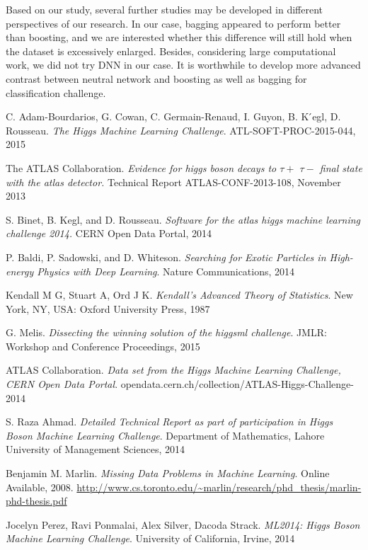 \documentclass[11pt]{article}
\begin{document}
Based on our study, several further studies may be developed in different perspectives of our research. In our case,  bagging appeared to perform better than boosting, and we are interested whether this difference will still hold when the dataset is excessively enlarged. Besides, considering large computational work, we did not try DNN in our case. It is worthwhile to develop more advanced contrast between neutral network and boosting as well as bagging for classification challenge.

\vspace{40pt}

\begin{thebibliography}{19}

C. Adam-Bourdarios, G. Cowan, C. Germain-Renaud, I. Guyon, B. K ́egl, D. Rousseau.
\textit{The Higgs Machine Learning Challenge}.
ATL-SOFT-PROC-2015-044, 2015

The ATLAS Collaboration.
\textit{Evidence for higgs boson decays to $\tau+$ $\tau-$ final state with the atlas detector.}
Technical Report ATLAS-CONF-2013-108, November 2013
 
S. Binet, B. Kegl, and D. Rousseau.
\textit{Software for the atlas higgs machine learning challenge 2014.}
CERN Open Data Portal, 2014


P. Baldi, P. Sadowski, and D. Whiteson.
\textit{Searching for Exotic Particles in High-energy Physics with Deep Learning}. 
Nature Communications, 2014
 
Kendall M G, Stuart A, Ord J K.
\textit{Kendall’s Advanced Theory of Statistics}. 
New York, NY, USA: Oxford University Press, 1987
 
G. Melis.
\textit{Dissecting the winning solution of the higgsml challenge}. 
JMLR: Workshop and Conference Proceedings, 2015

ATLAS Collaboration.
\textit{Data set from the Higgs Machine Learning Challenge, CERN Open Data Portal}. 
opendata.cern.ch/collection/ATLAS-Higgs-Challenge-2014
 
S. Raza Ahmad.
\textit{ Detailed Technical Report as part of participation in
Higgs Boson Machine Learning Challenge}. 
Department of Mathematics, Lahore University of Management Sciences, 2014
 
Benjamin M. Marlin.
\textit{Missing Data Problems in Machine Learning}. 
Online Available, 2008.  \url{http://www.cs.toronto.edu/~marlin/research/phd_thesis/marlin-phd-thesis.pdf} 


Jocelyn Perez, Ravi Ponmalai, Alex Silver, Dacoda Strack.
\textit{ ML2014: Higgs Boson Machine Learning Challenge}. 
University of California, Irvine, 2014


\end{thebibliography}
\end{document}
